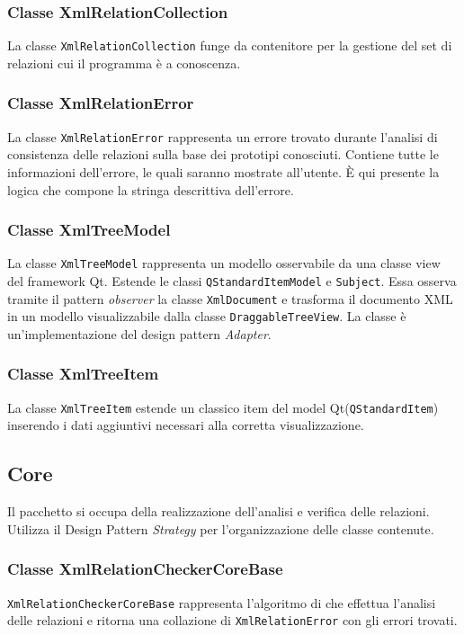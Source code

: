 	\subsubsection{Classe XmlRelationCollection}
		La classe \texttt{XmlRelationCollection} funge da contenitore per la gestione del set di relazioni cui il programma è a conoscenza.

	\subsubsection{Classe XmlRelationError}
		La classe \texttt{XmlRelationError} rappresenta un errore trovato durante l'analisi di consistenza delle relazioni sulla base dei prototipi conosciuti. Contiene tutte le informazioni dell'errore, le quali saranno mostrate all'utente. È qui presente la logica che compone la stringa descrittiva dell'errore.
		
	\subsubsection{Classe XmlTreeModel}
		La classe \texttt{XmlTreeModel} rappresenta un modello osservabile da una classe view del framework Qt\textregistered. Estende le classi \texttt{QStandardItemModel} e \texttt{Subject}. Essa osserva tramite il pattern \textit{observer} la classe \texttt{XmlDocument} e trasforma il documento XML in un modello visualizzabile dalla classe \texttt{DraggableTreeView}. La classe è un'implementazione del design pattern \textit{Adapter}.
		
	\subsubsection{Classe XmlTreeItem}
		La classe \texttt{XmlTreeItem} estende un classico item del model Qt\textregistered (\texttt{QStandardItem}) inserendo i dati aggiuntivi necessari alla corretta visualizzazione.

\subsection{Core}
	Il pacchetto si occupa della realizzazione dell'analisi e verifica delle relazioni. Utilizza il Design Pattern \textit{Strategy} per l'organizzazione delle classe contenute.

	\subsubsection{Classe XmlRelationCheckerCoreBase}
		\texttt{XmlRelationCheckerCoreBase} rappresenta l'algoritmo di che effettua l'analisi delle relazioni e ritorna una collazione di \texttt{XmlRelationError} con gli errori trovati.
	
